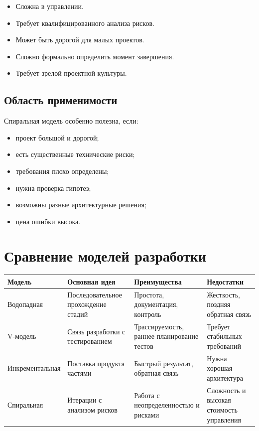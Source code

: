 \documentclass[12pt,a4paper]{article}
\begin{document}
\begin{itemize}
    \item Сложна в управлении.
    \item Требует квалифицированного анализа рисков.
    \item Может быть дорогой для малых проектов.
    \item Сложно формально определить момент завершения.
    \item Требует зрелой проектной культуры.
\end{itemize}

\subsection{Область применимости}

Спиральная модель особенно полезна, если:
\begin{itemize}
    \item проект большой и дорогой;
    \item есть существенные технические риски;
    \item требования плохо определены;
    \item нужна проверка гипотез;
    \item возможны разные архитектурные решения;
    \item цена ошибки высока.
\end{itemize}

\section{Сравнение моделей разработки}

\begin{center}
\begin{tabular}{p{} p{} p{} p{}}
\toprule
\textbf{Модель} & \textbf{Основная идея} & \textbf{Преимущества} & \textbf{Недостатки} \\
\midrule
Водопадная & Последовательное прохождение стадий & Простота, документация, контроль & Жесткость, поздняя обратная связь \\
V-модель & Связь разработки с тестированием & Трассируемость, раннее планирование тестов & Требует стабильных требований \\
Инкрементальная & Поставка продукта частями & Быстрый результат, обратная связь & Нужна хорошая архитектура \\
Спиральная & Итерации с анализом рисков & Работа с неопределенностью и рисками & Сложность и высокая стоимость управления \\
\bottomrule
\end{tabular}
\end{center}
\end{document}
